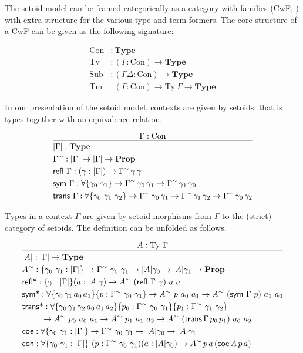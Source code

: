 \documentclass{easychair}
\newcommand{\GG}{\Gamma}
\newcommand{\GD}{\Delta}
\newcommand{\mType}{\mathbf{Type}}
\newcommand{\mProp}{\mathbf{Prop}}
\newcommand{\Con}{\mathrm{Con}}
\newcommand{\Ty}{\mathrm{Ty}}
\newcommand{\Tm}{\mathrm{Tm}}
\newcommand{\Sub}{\mathrm{Sub}}
\begin{document}
The setoid model can be framed categorically as a category with families (CwF,
\cite{internal-tt}) with extra structure for the various type and term
formers. The core structure of a CwF can be given as the following signature:

\begin{align*}
  \Con &: \mType \\
  \Ty &: (\GG : \Con) \to \mType \\
  \Sub &: (\GG \GD : \Con) \to \mType \\
  \Tm &: (\GG : \Con) \to \Ty\ \GG \to \mType
\end{align*}

In our presentation of the setoid model, contexts are given by setoids, that is
types together with an equivalence relation.

\[
\infer{
  \begin{aligned}
    & | \GG | : \mType \\
    & \GG^\sim : | \GG | \to | \GG | \to \mProp \\
    & \textsf{refl}\ \GG : (\gamma : | \GG |) \to \GG^\sim\,\gamma\,\gamma \\
    & \textsf{sym} \ \GG : \forall\{\gamma_0\ \gamma_1\} \to \GG^\sim\,\gamma_0\,\gamma_1
    \to \GG^\sim\,\gamma_1\,\gamma_0 \\
    & \textsf{trans} \ \GG : \forall\{\gamma_0\ \gamma_1\ \gamma_2\}
    \to \GG^\sim\,\gamma_0\,\gamma_1
    \to \GG^\sim\,\gamma_1\,\gamma_2
    \to \GG^\sim\,\gamma_0\,\gamma_2
  \end{aligned}
}{
  \GG : \Con
}
\]

Types in a context $\GG$ are given by setoid morphisms from $\GG$ to the
(strict) category of setoids. The definition can be unfolded as follows.

\[
\infer{
  \begin{aligned}
    & | A | : | \GG | \to \mType \\
    & A^\sim : \{\gamma_0\ \gamma_1 : | \GG |\}
    \to \GG^\sim\ \gamma_0\ \gamma_1 \to | A | \gamma_0 \to | A | \gamma_1 \to \mProp \\
    & \textsf{refl*} : \{\gamma : | \GG | \} (a : | A | \gamma) \to A^\sim\ (\textsf{refl}\ \GG\ \gamma)\ a\ a \\
    & \textsf{sym*} : \forall\{\gamma_0\,\gamma_1\,a_0\,a_1\}\{p : \GG^\sim\ \gamma_0\ \gamma_1\}
    \to A^\sim\ p\ a_0\ a_1 \to A^\sim\ (\textsf{sym}\ \GG\ p)\ a_1\ a_0 \\
    & \textsf{trans*} : \forall\{\gamma_0\,\gamma_1\,\gamma_2\,a_0\,a_1\,a_2\}\{p_0 : \GG^\sim\ \gamma_0\ \gamma_1\}\{p_1 : \GG^\sim\ \gamma_1\ \gamma_2\}\\
    & \ \qquad \to A^\sim\ p_0\ a_0\ a_1\to A^\sim\ p_1\ a_1\ a_2\to A^\sim\ (\textsf{trans}\,\GG\,p_0\,p_1)\ a_0\ a_2\\
    & \textsf{coe} : \forall\{\gamma_0\ \gamma_1 : | \GG |\} \to \GG^\sim\ \gamma_0\ \gamma_1 \to | A | \gamma_0 \to | A | \gamma_1 \\
    & \textsf{coh} : \forall\{\gamma_0\ \gamma_1 : | \GG |\} \ (p : \GG^\sim\ \gamma_0\ \gamma_1) (a : | A | \gamma_0)
    \to A^\sim\,p\,a\,(\textsf{coe}\,A\,p\,a) \\
  \end{aligned}
}{
  A : \Ty\ \GG
}
\]
\end{document}
